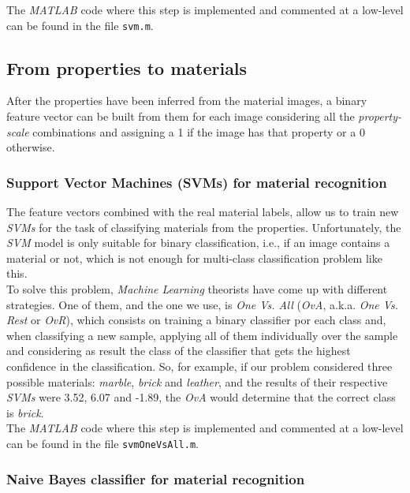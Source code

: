 The \emph{MATLAB} code where this step is implemented and commented at a low-level can be found in the file \texttt{svm.m}.


\subsection{From properties to materials}

After the properties have been inferred from the material images, a binary feature vector can be built from them for each image considering all the \emph{property-scale} combinations and assigning a 1 if the image has that property or a 0 otherwise.

\subsubsection{Support Vector Machines (SVMs) for material recognition}

The feature vectors combined with the real material labels, allow us to train new \emph{SVMs} for the task of classifying materials from the properties. Unfortunately, the \emph{SVM} model is only suitable for binary classification, i.e., if an image contains a material or not, which is not enough for multi-class classification problem like this. \\

To solve this problem, \emph{Machine Learning} theorists have come up with different strategies. One of them, and the one we use, is \emph{One Vs. All} (\emph{OvA}, a.k.a. \emph{One Vs. Rest} or \emph{OvR}), which consists on training a binary classifier por each class and, when classifying a new sample, applying all of them individually over the sample and considering as result the class of the classifier that gets the highest confidence in the classification. So, for example, if our problem considered three possible materials: \emph{marble}, \emph{brick} and \emph{leather}, and the results of their respective \emph{SVMs} were 3.52, 6.07 and -1.89, the \emph{OvA} would determine that the correct class is \emph{brick}. \\

The \emph{MATLAB} code where this step is implemented and commented at a low-level can be found in the file \texttt{svmOneVsAll.m}.


\subsubsection{Naive Bayes classifier for material recognition}

